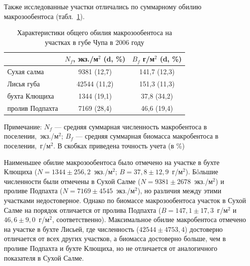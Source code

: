 Также исследованные участки отличались по суммарному обилию макрозообентоса (табл.~\ref{tab:NB_fauna_spat}). 
	\begin{table}[h]
	\caption{Характеристики общего обилия макрозообентоса  на участках в губе Чупа в 2006 году}
	\label{tab:NB_fauna_spat}
	\begin{center}
		\begin{tabular}{|l|c|c|}
		\hline
		                & $N_f$, экз./м$^2$ (d, \%) & $B_f$ г/м$^2$ (d, \%)      \\ \hline 
		Сухая салма     & 9381 (12,7) & 141,7 (12,3) \\
		Лисья губа      & 42544 (11,2) & 151,3  (11,3) \\
		бухта Клющиха   & 1344 (19,1) & 37,8 (34,2) \\
		пролив Подпахта & 7169 (28,4) & 46,6 (19,4) \\ \hline
		\end{tabular}
	\end{center}

\footnotesize{Примечание: $N_f$ --- средняя суммарная численность макробентоса в поселении,~экз./м$^2$; $B_f$ --- средняя суммарная биомасса макробентоса в поселении,~г/м$^2$. В скобках приведена точность учета (в \%)}
	\end{table}
Наименьшее обилие макрозообентоса было отмечено на участке в бухте Клющиха ($N = 1344 \pm 256,2$~экз./м$^2$; $B = 37,8 \pm 12,9$~г/м$^2$). 
Б\^{o}льшие численности были отмечены в Сухой Салме ($N = 9381 \pm 2678$~экз./м$^2$) и проливе Подпахта ($N = 7169 \pm 4545$~экз./м$^2$), но различия между этими участками недостоверное. 
Однако по биомассе макрозообентоса участок в Сухой Салме на порядок отличается от пролива Подпахта ($B = 147,1 \pm 17,3$~г/м$^2$ и $46,6 \pm 9,0$~г/м$^2$, соответственно). 
Максимальное обилие макробентоса отмечено на участке в бухте Лисьей, где численность ($42544 \pm 4753,4$) достоверно отличается от всех других участков, а биомасса достоверно больше, чем в проливе Подпахта и бухте Клющиха, но не отличается от аналогичного показателя в Сухой Салме.

